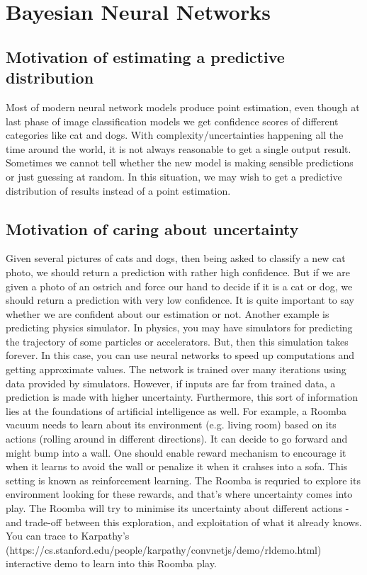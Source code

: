 \chapter{Bayesian Neural Networks}

\section{ Motivation of estimating a predictive distribution }

Most of modern neural network models produce point estimation, even though at last phase of image classification models we get confidence scores of different categories like cat and dogs. With complexity/uncertainties happening all the time around the world, it is not always reasonable to get a single output result. Sometimes we cannot tell whether the new model is making sensible predictions or just guessing at random. In this situation, we may wish to get a predictive distribution of results instead of a point estimation.\\

\section{Motivation of caring about uncertainty}

Given several pictures of cats and dogs, then being asked to classify a new cat photo, we should return a prediction with rather high confidence. But if we are given a photo of an ostrich and force our hand to decide if it is a cat or dog, we should return a prediction with very low confidence. It is quite important to say whether we are confident about our estimation or not. Another example is predicting physics simulator. In physics, you may have simulators for predicting the trajectory of some particles or accelerators. But, then this simulation takes forever. In this case, you can use neural networks to speed up computations and getting approximate values. The network is trained over many iterations using data provided by simulators. However, if inputs are far from trained data, a prediction is made with higher uncertainty. Furthermore, this sort of information lies at the foundations of artificial intelligence as well. For example, a Roomba vacuum needs to learn about its environment (e.g. living room) based on its actions (rolling around in different directions). It can decide to go forward and might bump into a wall. One should enable reward mechanism to encourage it when it learns to avoid the wall or penalize it when it crahses into a sofa. This setting is known as reinforcement learning. The Roomba is requried to explore its environment looking for these rewards, and that's where uncertainty comes into play. The Roomba will try to minimise its uncertainty about different actions - and trade-off between this exploration, and exploitation of what it already knows. You can trace to Karpathy's (https://cs.stanford.edu/people/karpathy/convnetjs/demo/rldemo.html) interactive demo to learn into this Roomba play. 

